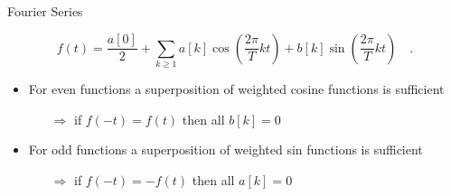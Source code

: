\begin{frame}[t]{Fourier Series}

    \begin{center}
        \[f(t) = \dfrac {a[0]}{2} + \sum\limits_{k\ge1} a[k] \cos\left(\frac{2\pi}{T}kt\right) + b[k] \sin\left(\frac{2\pi}{T}kt\right)\quad.\]
    \end{center}

    \begin{itemize}
        \setlength\itemsep{1.5em}
        \item For even functions a superposition of weighted cosine functions is sufficient
              \vspace{0.1cm}
              \begin{itemize}
                  \item [$\Rightarrow$] if $f(-t)=f(t)$ then all $b[k]=0$
              \end{itemize}

        \item For odd functions a superposition of weighted sin functions is sufficient

              \vspace{0.1cm}
              \begin{itemize}
                  \item[$\Rightarrow$] if $f(-t)=-f(t)$ then all $a[k]=0$
              \end{itemize}

    \end{itemize}

\end{frame}






